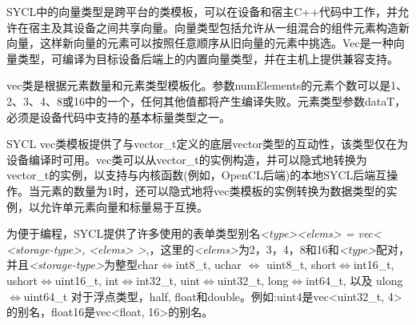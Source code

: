 SYCL中的向量类型是跨平台的类模板，可以在设备和宿主C++代码中工作，并允许在宿主及其设备之间共享向量。向量类型包括允许从一组混合的组件元素构造新向量，这样新向量的元素可以按照任意顺序从旧向量的元素中挑选。Vec是一种向量类型，可编译为目标设备后端上的内置向量类型，并在主机上提供兼容支持。\par

vec类是根据元素数量和元素类型模板化。参数numElements的元素个数可以是1、2、3、4、8或16中的一个，任何其他值都将产生编译失败。元素类型参数dataT，必须是设备代码中支持的基本标量类型之一。\par

SYCL vec类模板提供了与vector\_t定义的底层vector类型的互动性，该类型仅在为设备编译时可用。vec类可以从vector\_t的实例构造，并可以隐式地转换为vector\_t的实例，以支持与内核函数(例如，OpenCL后端)的本地SYCL后端互操作。当元素的数量为1时，还可以隐式地将vec类模板的实例转换为数据类型的实例，以允许单元素向量和标量易于互换。\par

为便于编程，SYCL提供了许多使用的表单类型别名\textit{<type><elems> = vec< <storage-type>, <elems> >},，这里的\textit{<elems>}为2，3，4，8和16和\textit{<type>}配对，并且\textit{<storage-type>}为整型char$\Leftrightarrow$int8\_t, uchar $\Leftrightarrow$ uint8\_t, short$\Leftrightarrow$int16\_t, ushort$\Leftrightarrow$uint16\_t, int$\Leftrightarrow$int32\_t, uint$\Leftrightarrow$uint32\_t, long$\Leftrightarrow$int64\_t, 以及 ulong$\Leftrightarrow$uint64\_t 对于浮点类型，half, float和double。例如:uint4是vec<uint32\_t, 4>的别名，float16是vec<float, 16>的别名。\par












